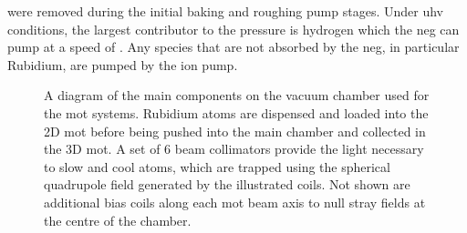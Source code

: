 were removed during the initial baking and roughing pump stages. Under
\ac{uhv} conditions, the largest contributor to the pressure is hydrogen
which the \ac{neg} can pump at a speed of .
Any species that are not absorbed by the \ac{neg}, in particular Rubidium,
are pumped by the  ion pump.
\begin{figure}
	\centering
	\def\svgwidth{1\textwidth}
	
	\caption[\ac{mot} system component diagram]{A diagram of the main components on the vacuum chamber used for the \ac{mot}
		systems. Rubidium atoms are dispensed and loaded into the 2D \ac{mot} before
		being pushed into the main chamber and collected in the 3D \ac{mot}. A set of
		6 beam collimators provide the light necessary to slow and cool atoms, which
		are trapped using the spherical quadrupole field generated by the illustrated
		coils. Not shown are additional bias coils along each \ac{mot} beam axis to
		null stray fields at the centre of the chamber.}
	\label{fig:mot_system}
\end{figure}
